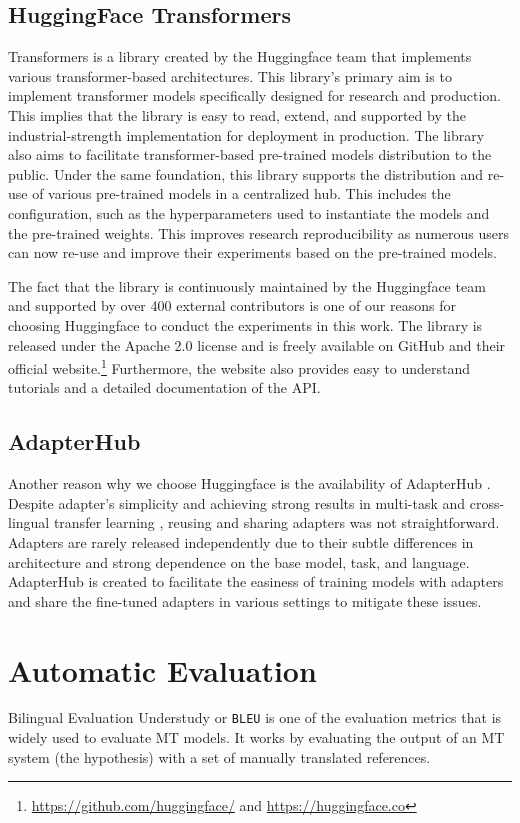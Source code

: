\subsection{HuggingFace Transformers}
Transformers  is a library created by the Huggingface team that implements various transformer-based architectures. This library's primary aim is to implement transformer models specifically designed for research and production. This implies that the library is easy to read, extend, and supported by the industrial-strength implementation for deployment in production. The library also aims to facilitate transformer-based pre-trained models distribution to the public. Under the same foundation, this library supports the distribution and re-use of various pre-trained models in a centralized hub. This includes the configuration, such as the hyperparameters used to instantiate the models and the pre-trained weights. This improves research reproducibility as numerous users can now re-use and improve their experiments based on the pre-trained models.

The fact that the library is continuously maintained by the Huggingface team and supported by over 400 external contributors is one of our reasons for choosing Huggingface to conduct the experiments in this work. The library is released under the Apache 2.0 license and is freely available on GitHub and their official website.\footnote{\url{https://github.com/huggingface/} and \url{https://huggingface.co}} Furthermore, the website also provides easy to understand tutorials and a detailed documentation of the API.

\subsection{AdapterHub}
Another reason why we choose Huggingface is the availability of AdapterHub . Despite adapter's simplicity and achieving strong results in multi-task and cross-lingual transfer learning , reusing and sharing adapters was not straightforward. Adapters are rarely released independently due to their subtle differences in architecture and strong dependence on the base model, task, and language. AdapterHub is created to facilitate the easiness of training models with adapters and share the fine-tuned adapters in various settings to mitigate these issues.

\section{Automatic Evaluation}
\label{sec:aeval}
Bilingual Evaluation Understudy or \texttt{BLEU}  is one of the evaluation metrics that is widely used to evaluate MT models. It works by evaluating the output of an MT system (the hypothesis) with a set of manually translated references.

